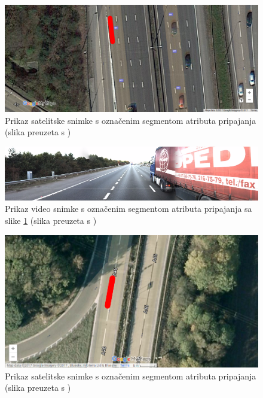 \documentclass[times, utf8, diplomski, numeric]{fer}
\begin{document}
\begin{figure}[H]
\centering
\includegraphics[scale=0.35]{images/sattelite_merge_lane_irap.png}
\caption{Prikaz satelitske snimke s označenim segmentom atributa pripajanja (slika preuzeta s \citep{url:google_maps})}
\label{img:sattelite_merge_lane_irap}
\end{figure}

\begin{figure}[H]
\centering
\includegraphics[scale=0.5]{images/video_merge_lane_irap.png}
\caption{Prikaz video snimke s označenim segmentom atributa pripajanja sa slike \ref{img:sattelite_merge_lane_irap} (slika preuzeta s \citep{url:ftts_irap})}
\label{img:video_merge_lane_irap}
\end{figure}

\begin{figure}[H]
\centering
\includegraphics[scale=0.35]{images/sattelite_merge_lane_irap2.png}
\caption{Prikaz satelitske snimke s označenim segmentom atributa pripajanja (slika preuzeta s \citep{url:google_maps})}
\label{img:sattelite_merge_lane_irap2}
\end{figure}
\end{document}
